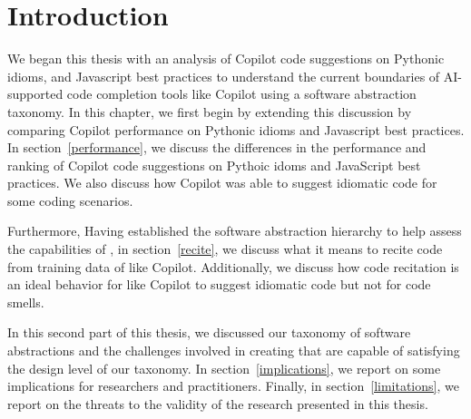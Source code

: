 \label{chapter:discussion}

\section{Introduction}
We began this thesis with an analysis of Copilot code suggestions on Pythonic idioms, and Javascript best practices to understand the current boundaries of AI-supported code completion tools like Copilot using a software abstraction taxonomy. 
In this chapter, we first begin by extending this discussion by comparing Copilot performance on Pythonic idioms and Javascript best practices. In section~\ref{performance}, we discuss the differences in the performance and ranking of Copilot code suggestions on Pythoic idoms and JavaScript best practices. We also discuss how Copilot was able to suggest idiomatic code for some coding scenarios.

Furthermore, Having established the software abstraction hierarchy to help assess the capabilities of \cct{}, 
in section~\ref{recite}, we discuss what it means to recite code from training data of \cct{} like Copilot.
Additionally, we discuss how code recitation is an ideal behavior for \cct{} like Copilot to suggest idiomatic code but not for code smells.

In this second part of this thesis, we discussed our taxonomy of software abstractions and the challenges involved in creating \cct{} that are capable of satisfying the design level of our taxonomy. In section~\ref{implications}, we report on some implications for researchers and practitioners.
Finally, in section~\ref{limitations}, we report on the threats to the validity of the research presented in this thesis.










